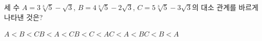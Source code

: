 세 수 $A=3\sqrt[3]{5}-\sqrt{3}$, $B=4\sqrt[3]{5}-2\sqrt{3}$, $C=5\sqrt[3]{5}-3\sqrt{3}$의 대소 관계를 바르게 나타낸 것은?
\begin{choices32}{$A<B<C$}{$B<A<C$}{$B<C<A$}{$C<A<B$}{$C<B<A$}\end{choices32}

